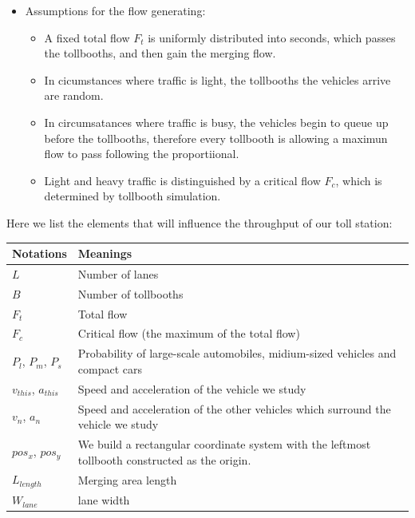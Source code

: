 \documentclass{mcmthesis}
\begin{document}
\begin{itemize}
\begin{itemize}
    \end{itemize}
    \item Assumptions for the flow generating:
    \begin{itemize}
    \item A fixed total flow $F_t$ is uniformly distributed into seconds, which passes the tollbooths, and then gain the merging flow.
   	\item In cicumstances where traffic is light, the tollbooths the vehicles arrive are random.
    \item In circumsatances where traffic is busy, the vehicles begin to queue up before the tollbooths, therefore every tollbooth is allowing a maximun flow to pass following the proportiional.
    \item Light and heavy traffic is distinguished by a critical flow  $F_c$, which is determined by tollbooth simulation.
    \end{itemize}
	
	
\end{itemize}



Here we list the elements that will influence the throughput of our toll station:
\begin{table}[h]
\centering
   \begin{tabular}{|m{7cm}<{\centering}|p{7cm}<{\centering}|}
   	
   	\hline
   	Notations & Meanings \\
   	\hline
   	$L$ &  Number of lanes \\
   	\hline
   	$B$ &  Number of tollbooths\\
   	\hline
   	$F_t$ & 	 Total flow\\
   	\hline
   	$F_c$ & Critical flow (the maximum of the total flow)\\
   	\hline
   	$P_l$,  $P_m$, $P_s$ & Probability of large-scale automobiles, midium-sized vehicles and compact cars\\
   	\hline
   	$v_{this}$, $a_{this}$ & Speed and acceleration of the vehicle we study\\
   	\hline
   	$v_n$, $a_n$ &  Speed and acceleration of the other vehicles which surround the vehicle we study\\
   	\hline
   	$pos_x$, $pos_y$ & We build a rectangular coordinate system  with the leftmost tollbooth constructed as the origin.\\
   	\hline
   	$L_{length}$ & Merging area length \\
   	\hline
   	$W_{lane}$ & lane width \\
   	\hline

   \end{tabular}
\end{table}\\
\end{document}
